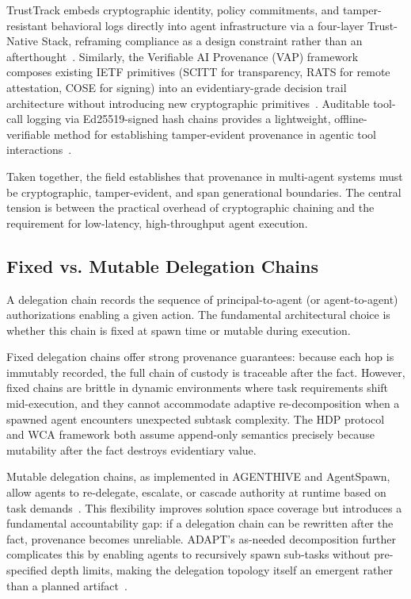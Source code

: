 TrustTrack embeds cryptographic identity, policy commitments, and tamper-resistant behavioral logs directly into agent infrastructure via a four-layer Trust-Native Stack, reframing compliance as a design constraint rather than an afterthought~\cite{trusttrack}. Similarly, the Verifiable AI Provenance (VAP) framework composes existing IETF primitives (SCITT for transparency, RATS for remote attestation, COSE for signing) into an evidentiary-grade decision trail architecture without introducing new cryptographic primitives~\cite{vap-framework}. Auditable tool-call logging via Ed25519-signed hash chains provides a lightweight, offline-verifiable method for establishing tamper-evident provenance in agentic tool interactions~\cite{langchain-audit}.

Taken together, the field establishes that provenance in multi-agent systems must be cryptographic, tamper-evident, and span generational boundaries. The central tension is between the practical overhead of cryptographic chaining and the requirement for low-latency, high-throughput agent execution.

\subsection{Fixed vs. Mutable Delegation Chains}

A delegation chain records the sequence of principal-to-agent (or agent-to-agent) authorizations enabling a given action. The fundamental architectural choice is whether this chain is fixed at spawn time or mutable during execution.

Fixed delegation chains offer strong provenance guarantees: because each hop is immutably recorded, the full chain of custody is traceable after the fact. However, fixed chains are brittle in dynamic environments where task requirements shift mid-execution, and they cannot accommodate adaptive re-decomposition when a spawned agent encounters unexpected subtask complexity. The HDP protocol and WCA framework both assume append-only semantics precisely because mutability after the fact destroys evidentiary value.

Mutable delegation chains, as implemented in AGENTHIVE and AgentSpawn, allow agents to re-delegate, escalate, or cascade authority at runtime based on task demands~\cite{agenthive,agentspawn}. This flexibility improves solution space coverage but introduces a fundamental accountability gap: if a delegation chain can be rewritten after the fact, provenance becomes unreliable. ADAPT's as-needed decomposition further complicates this by enabling agents to recursively spawn sub-tasks without pre-specified depth limits, making the delegation topology itself an emergent rather than a planned artifact~\cite{adapt}.

